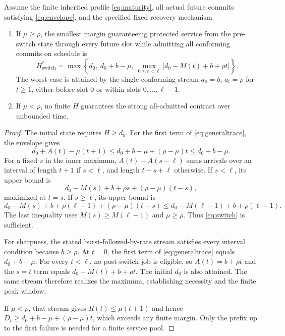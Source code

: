 \begin{theorem}
\label{thm:handoff}
Assume the finite inherited profile \cref{eq:maturity}, all actual future commits satisfying \cref{eq:envelope}, and the specified fixed recovery mechanism.
\begin{enumerate}[label=(\roman*)]
\item If $\mu\ge\rho$, the smallest margin guaranteeing protected service from the pre-switch state through every future slot while admitting all conforming commits on schedule is
\begin{equation}
\boxed{H^*_{\mathrm{switch}}=\max\left\{d_0,\ d_0+b-\mu,\
\max_{0\le t<\ell}\big[d_0-M(t)+b+\rho t\big]\right\}.}
\label{eq:switch}
\end{equation}
The worst case is attained by the single conforming stream $a_0=b$, $a_t=\rho$ for $t\ge1$, either before slot 0 or within slots $0,\ldots,\ell-1$.
\item If $\mu<\rho$, no finite $H$ guarantees the strong all-admitted contract over unbounded time.
\end{enumerate}
\end{theorem}
\begin{proof}
The initial state requires $H\ge d_0$. For the first term of \cref{eq:generaltrace}, the envelope gives
\[
d_0+A(t)-\mu(t+1)\le d_0+b-\mu+(\rho-\mu)t\le d_0+b-\mu.
\]
For a fixed $s$ in the inner maximum, $A(t)-A(s-\ell)$ sums arrivals over an interval of length $t+1$ if $s<\ell$, and length $t-s+\ell$ otherwise. If $s<\ell$, its upper bound is
\[
d_0-M(s)+b+\rho s+(\rho-\mu)(t-s),
\]
maximized at $t=s$. If $s\ge\ell$, its upper bound is
\[
d_0-M(s)+b+\rho(\ell-1)+(\rho-\mu)(t-s)
\le d_0-M(\ell-1)+b+\rho(\ell-1).
\]
The last inequality uses $M(s)\ge M(\ell-1)$ and $\mu\ge\rho$. Thus \cref{eq:switch} is sufficient.

For sharpness, the stated burst-followed-by-rate stream satisfies every interval condition because $b\ge\rho$. At $t=0$, the first term of \cref{eq:generaltrace} equals $d_0+b-\mu$. For every $t<\ell$, no post-switch job is eligible, so $A(t)=b+\rho t$ and the $s=t$ term equals $d_0-M(t)+b+\rho t$. The initial $d_0$ is also attained. The same stream therefore realizes the maximum, establishing necessity and the finite peak window.

If $\mu<\rho$, that stream gives $R(t)\le\mu(t+1)$ and hence $D_t\ge d_0+b-\mu+(\rho-\mu)t$, which exceeds any finite margin. Only the prefix up to the first failure is needed for a finite service pool.
\end{proof}

